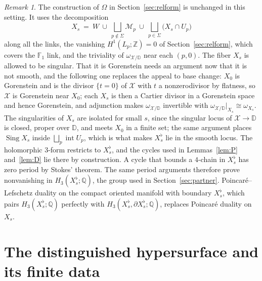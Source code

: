 \documentclass[11pt]{amsart}
\theoremstyle{definition}
\theoremstyle{remark}
\newtheorem{remark}[theorem]{Remark}
\theoremstyle{plain}
\newcommand{\ZZ}{\mathbb{Z}}
\newcommand{\QQ}{\mathbb{Q}}
\newcommand{\Mil}{\mathcal{M}}  %
\newcommand{\cX}{\mathcal{X}}
\newcommand{\Sing}{\operatorname{Sing}}
\newcommand{\Disk}{\mathbb{D}}
\begin{document}
\begin{remark}\label{rem:partialform}
The construction of $\Omega$ in Section~\ref{sec:relform} is unchanged
in this setting.  It uses the decomposition
\[
X_s\ =\ W\ \cup\ \bigsqcup_{p\notin\Sigma}\Mil_p\ \cup\
\bigsqcup_{p\in\Sigma}\bigl(X_s\cap U_p\bigr)
\]
along all the links, the vanishing $H^1(L_p;\ZZ)=0$ of
Section~\ref{sec:relform}, which covers the $\mathbb F_1$ link, and the
triviality of $\omega_{\cX/\Disk}$ near each $(p,0)$.  The fiber $X_s$
is allowed to be singular.  That it is Gorenstein needs an argument
now that it is not smooth, and the following one replaces the appeal
to base change: $X_0$ is Gorenstein and is the divisor $\{t=0\}$ of
$\cX$ with $t$ a nonzerodivisor by flatness, so $\cX$ is Gorenstein
near $X_0$; each $X_s$ is then a Cartier divisor in a Gorenstein space
and hence Gorenstein, and adjunction makes $\omega_{\cX/\Disk}$
invertible with $\omega_{\cX/\Disk}|_{X_s}\cong\omega_{X_s}$.  The
singularities of $X_s$ are isolated for small $s$, since the singular
locus of $\cX\to\Disk$ is closed, proper over $\Disk$, and meets $X_0$
in a finite set; the same argument places $\Sing X_s$ inside
$\bigsqcup_p\operatorname{int}U_p$, which is what makes
$X_s^{\flat}$ lie in the smooth locus.  The holomorphic $3$-form restricts
to $X_s^{\flat}$, and the cycles used in Lemmas~\ref{lem:P} and~\ref{lem:D}
lie there by construction.  A cycle that bounds a $4$-chain in
$X_s^{\flat}$ has zero period by Stokes' theorem.  The same period arguments
therefore prove nonvanishing in $H_3(X_s^{\flat};\QQ)$, the group used in
Section~\ref{sec:partner}.  Poincar\'e--Lefschetz duality on the
compact oriented manifold with boundary $X_s^{\flat}$, which pairs
$H_3(X_s^{\flat};\QQ)$ perfectly with
$H_3(X_s^{\flat},\partial X_s^{\flat};\QQ)$, replaces Poincar\'e
duality on $X_s$.
\end{remark}

\section{The distinguished hypersurface and its finite data}
\label{sec:example}
\end{document}
